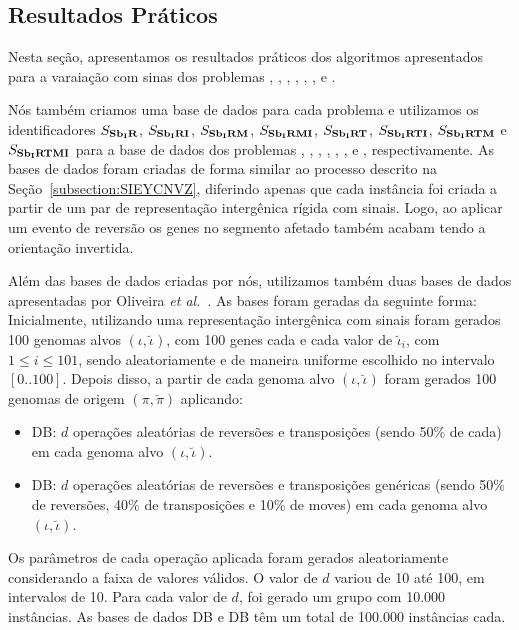 \subsection{Resultados Práticos}

Nesta seção, apresentamos os resultados práticos dos algoritmos apresentados para a varaiação com sinas dos problemas \SbIR{}, \SbIRI{}, \SbIRM{}, \SbIRMI{}, \SbIRT{}, \SbIRTI{}, \SbIRTM{} e \SbIRTMI{}.

Nós também criamos uma base de dados para cada problema e utilizamos os identificadores $S_{\textbf{Sb\textsubscript{I}R}}{}$, $S_{\textbf{Sb\textsubscript{I}RI}}{}$, $S_{\textbf{Sb\textsubscript{I}RM}}{}$, $S_{\textbf{Sb\textsubscript{I}RMI}}{}$, $S_{\textbf{Sb\textsubscript{I}RT}}{}$, $S_{\textbf{Sb\textsubscript{I}RTI}}{}$, $S_{\textbf{Sb\textsubscript{I}RTM}}{}$ e $S_{\textbf{Sb\textsubscript{I}RTMI}}{}$ para a base de dados dos problemas \SbIR{}, \SbIRI{}, \SbIRM{}, \SbIRMI{}, \SbIRT{}, \SbIRTI{}, \SbIRTM{} e \SbIRTMI{}, respectivamente. As bases de dados foram criadas de forma similar ao processo descrito na Seção~\ref{subsection:SIEYCNVZ}, diferindo apenas que cada instância foi criada a partir de um par de representação intergênica rígida com sinais. Logo, ao aplicar um evento de reversão os genes no segmento afetado também acabam tendo a orientação invertida.

Além das bases de dados criadas por nós, utilizamos também duas bases de dados apresentadas por Oliveira \textit{et al.}~\cite{2021a-oliveira-etal}. As bases foram geradas da seguinte forma: Inicialmente, utilizando uma representação  intergênica com sinais foram gerados 100 genomas alvos $(\iota,\breve\iota)$, com 100 genes cada e cada valor de $\breve\iota_i$, com $1 \le i \le 101$, sendo aleatoriamente e de maneira uniforme escolhido no intervalo $[0..100]$. Depois disso, a partir de cada genoma alvo $(\iota,\breve\iota)$ foram gerados 100 genomas de origem $(\pi,\breve\pi)$ aplicando:

\begin{itemize}
    \item DB\textsubscript{\SbIRT{}}: $d$ operações aleatórias de reversões e transposições (sendo 50\% de cada) em cada genoma alvo $(\iota,\breve\iota)$.
    \item DB\textsubscript{\SbIRTM{}}: $d$ operações aleatórias de reversões e transposições genéricas (sendo 50\% de reversões, 40\% de transposições e 10\% de moves) em cada genoma alvo $(\iota,\breve\iota)$.
\end{itemize}

Os parâmetros de cada operação aplicada foram gerados aleatoriamente considerando a faixa de valores válidos. O valor de $d$ variou de 10 até 100, em intervalos de 10. Para cada valor de $d$, foi gerado um grupo com 10.000 instâncias. As bases de dados DB\textsubscript{\SbIRT{}} e DB\textsubscript{\SbIRTM{}} têm um total de 100.000 instâncias cada.

